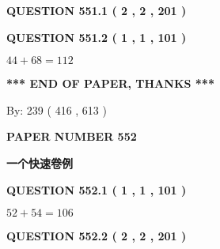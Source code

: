 \documentclass{ctexart}
\begin{document}
   
  
\vspace{0.2in}
  
{\textbf{\Large{QUESTION
551.1 
 ( 2 , 2 , 201 )
}}}
  
  
  
\vspace{0.2in}
  
{\textbf{\Large{QUESTION
551.2 
 ( 1 , 1 , 101 )
}}}
  
  
 
 

$ %
44 +  %
68=   %
112$
 
 
   
   
 \vspace{0.2in}
 
   
   
   
   
\vspace{1.0in} 
{\textbf{\large{ *** END OF PAPER, THANKS *** }}} 
   
   
\hspace{1.0in} By: 
 239 ( 416 ,  613 )
   
   
   
   
\newpage 
\setcounter{page}{ 
   552001 } 
   
   
   
   
 {\textbf{ \Large{ PAPER NUMBER  552  }}}
   
   
\vspace{0.2in}
   
   
   
   
   
   
 \vspace{0.2in}
{\LARGE {\textbf{ 一个快速卷例}}}
   
   
  
\vspace{0.2in}
  
{\textbf{\Large{QUESTION
552.1 
 ( 1 , 1 , 101 )
}}}
  
  
 
 

$ %
52 +  %
54=   %
106$
 
 
  
\vspace{0.2in}
  
{\textbf{\Large{QUESTION
552.2 
 ( 2 , 2 , 201 )
}}}
  
  
   
\end{document}
